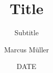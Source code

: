 %
\date{DATE}
\title[shorttitle]{Title}
\subtitle{Subtitle}
\author{Marcus Müller}

\newcommand{\GR}{{GNU\,Radio}}